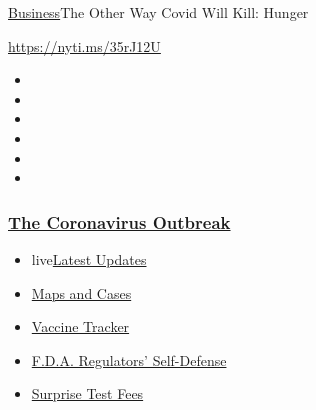 \href{/section/business}{Business}\textbar{}The Other Way Covid Will
Kill: Hunger

\url{https://nyti.ms/35rJ12U}

\begin{itemize}
\item
\item
\item
\item
\item
\item
\end{itemize}

\hypertarget{the-coronavirus-outbreak}{%
\subsubsection{\texorpdfstring{\href{https://www.nytimes3xbfgragh.onion/news-event/coronavirus?name=styln-coronavirus-markets\&region=TOP_BANNER\&block=storyline_menu_recirc\&action=click\&pgtype=Article\&impression_id=75e51e10-f52b-11ea-9a16-5d2ad197bf40\&variant=undefined}{The
Coronavirus
Outbreak}}{The Coronavirus Outbreak}}\label{the-coronavirus-outbreak}}

\begin{itemize}
\tightlist
\item
  live\href{https://www.nytimes3xbfgragh.onion/2020/09/12/world/covid-19-coronavirus.html?name=styln-coronavirus-markets\&region=TOP_BANNER\&block=storyline_menu_recirc\&action=click\&pgtype=Article\&impression_id=75e51e11-f52b-11ea-9a16-5d2ad197bf40\&variant=undefined}{Latest
  Updates}
\item
  \href{https://www.nytimes3xbfgragh.onion/interactive/2020/us/coronavirus-us-cases.html?name=styln-coronavirus-markets\&region=TOP_BANNER\&block=storyline_menu_recirc\&action=click\&pgtype=Article\&impression_id=75e54520-f52b-11ea-9a16-5d2ad197bf40\&variant=undefined}{Maps
  and Cases}
\item
  \href{https://www.nytimes3xbfgragh.onion/interactive/2020/science/coronavirus-vaccine-tracker.html?name=styln-coronavirus-markets\&region=TOP_BANNER\&block=storyline_menu_recirc\&action=click\&pgtype=Article\&impression_id=75e54521-f52b-11ea-9a16-5d2ad197bf40\&variant=undefined}{Vaccine
  Tracker}
\item
  \href{https://www.nytimes3xbfgragh.onion/2020/09/10/us/politics/fda-coronavirus-vaccine.html?name=styln-coronavirus-markets\&region=TOP_BANNER\&block=storyline_menu_recirc\&action=click\&pgtype=Article\&impression_id=75e54522-f52b-11ea-9a16-5d2ad197bf40\&variant=undefined}{F.D.A.
  Regulators' Self-Defense}
\item
  \href{https://www.nytimes3xbfgragh.onion/2020/09/09/upshot/coronavirus-surprise-test-fees.html?name=styln-coronavirus-markets\&region=TOP_BANNER\&block=storyline_menu_recirc\&action=click\&pgtype=Article\&impression_id=75e54523-f52b-11ea-9a16-5d2ad197bf40\&variant=undefined}{Surprise
  Test Fees}
\end{itemize}


